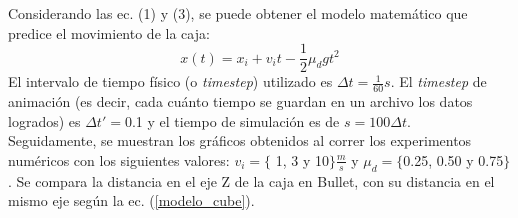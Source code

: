 \documentclass{article}
\begin{document}
Considerando las ec. (1) y (3), se puede obtener el modelo matem\'atico que predice el movimiento de la caja:
 \begin{equation}
 \label{modelo_cube}
  x(t) = x_i +v_i t-\frac{1}{2} \mu_d gt^2
\end{equation}
El intervalo de tiempo f\'isico (o \textit{timestep}) utilizado es $\Delta t=\frac{1}{60} s$. El \textit{timestep} de animaci\'on (es decir,
cada cu\'anto tiempo se guardan en un archivo los datos logrados) es $\Delta t' = $0.1 y el tiempo de simulaci\'on es de $s=100\Delta t$.\\
Seguidamente, se muestran los gr\'aficos obtenidos al correr los experimentos num\'ericos con los siguientes valores: $v_{i}= \{$ 1, 3 y 10$\} \frac{m}{s}$ y $\mu_{d}= \{ $0.25, 0.50 y 0.75$\} $. Se compara la distancia en el eje Z de la caja en Bullet, con su distancia en el mismo eje seg\'un la ec. (\ref{modelo_cube}). 
\end{document}
